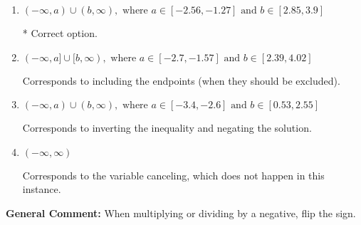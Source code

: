 \documentclass{extbook}[14pt]
\begin{document}
\begin{enumerate}
{\begin{enumerate}[label=\Alph*.]
Corresponds to including the endpoints AND negating.
\item \( (-\infty, a) \cup (b, \infty), \text{ where } a \in [-2.56, -1.27] \text{ and } b \in [2.85, 3.9] \)

 * Correct option.
\item \( (-\infty, a] \cup [b, \infty), \text{ where } a \in [-2.7, -1.57] \text{ and } b \in [2.39, 4.02] \)

Corresponds to including the endpoints (when they should be excluded).
\item \( (-\infty, a) \cup (b, \infty), \text{ where } a \in [-3.4, -2.6] \text{ and } b \in [0.53, 2.55] \)

Corresponds to inverting the inequality and negating the solution.
\item \( (-\infty, \infty) \)

Corresponds to the variable canceling, which does not happen in this instance.
\end{enumerate}

\textbf{General Comment:} When multiplying or dividing by a negative, flip the sign.
}
\end{enumerate}
\end{document}
